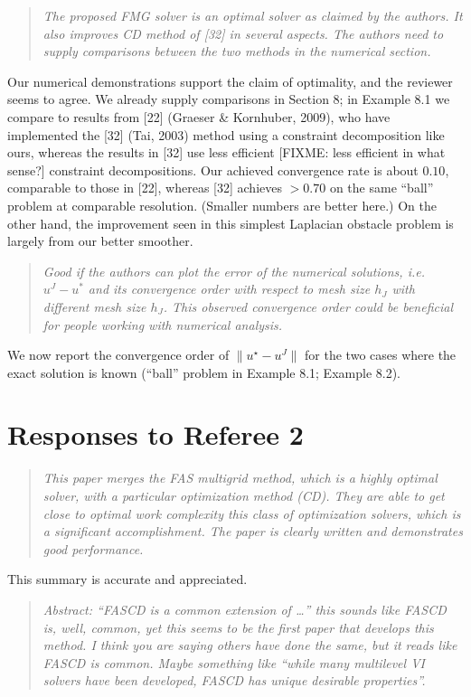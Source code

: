 \documentclass[letterpaper,final,12pt,reqno]{amsart}
\newenvironment{review}%
{\bigskip \par \begin{quote} \selectfont \sl}%
{\end{quote}}
\newcommand\short[1]{\medskip\noindent #1}   %
\begin{document}
\begin{review}
The proposed FMG solver is an optimal solver as claimed by the authors. It also improves CD method of [32] in several aspects. The authors need to supply comparisons between the two methods in the numerical section.
\end{review}

\short{Our numerical demonstrations support the claim of optimality, and the reviewer seems to agree.  We already supply comparisons in Section 8; in Example 8.1 we compare to results from [22] (Graeser \& Kornhuber, 2009), who have implemented the [32] (Tai, 2003) method using a constraint decomposition like ours, whereas the results in [32] use less efficient [FIXME: less efficient in what sense?] constraint decompositions.  Our achieved convergence rate is about $0.10$, comparable to those in [22], whereas [32] achieves $>0.70$ on the same ``ball'' problem at comparable resolution.  (Smaller numbers are better here.)  On the other hand, the improvement seen in this simplest Laplacian obstacle problem is largely from our better smoother.}

\begin{review}
Good if the authors can plot the error of the numerical solutions, i.e. $u^J - u^*$ and its convergence order with respect to mesh size $h_J$ with different mesh size $h_J$. This observed convergence order could be beneficial for people working with numerical analysis.
\end{review}

\short{We now report the convergence order of $\|u^\star - u^J\|$ for the two cases where the exact solution is known (``ball'' problem in Example 8.1; Example 8.2).}


\section{Responses to Referee 2}

\begin{review}
This paper merges the FAS multigrid method, which is a highly optimal solver, with a particular optimization method (CD).  They are able to get close to optimal work complexity this class of optimization solvers, which is a significant accomplishment.  The paper is clearly written and demonstrates good performance.
\end{review}

\short{This summary is accurate and appreciated.}

\begin{review}
Abstract: ``FASCD is a common extension of \dots'' this sounds like FASCD is, well, common, yet this seems to be the first paper that develops this method.  I think you are saying others have done the same, but it reads like FASCD is common.  Maybe something like ``while many multilevel VI solvers have been developed, FASCD has unique desirable properties''.
\end{review}
\end{document}
